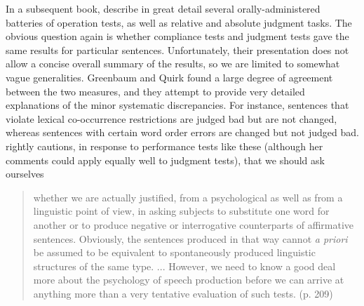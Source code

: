 In a subsequent book, \citet{GreenbaumEtAl1970} describe in great detail several orally-administered batteries of operation tests, as well as relative and
absolute judgment tasks. The obvious question again is whether compliance tests and judgment tests gave the same results for particular sentences. Unfortunately, their presentation does not allow a concise overall summary of the results, so we are limited to somewhat vague generalities. Greenbaum and Quirk found a large degree of agreement between the two measures, and they attempt to provide very detailed explanations of the minor systematic discrepancies. For instance, sentences that violate lexical co-occurrence restrictions are judged bad but are not changed, whereas sentences with certain word order errors are changed but not judged bad. \citet{Tottie1977} rightly cautions, in response to performance tests like these (although her comments could apply equally well to judgment tests), that we should ask ourselves

\begin{quote}
whether we are actually justified, from a psychological  as well as from a linguistic point of view, in asking subjects to substitute one word for another or to produce negative or interrogative counterparts of affirmative sentences. Obviously, the sentences produced in that way cannot \textit{a priori} be assumed to be equivalent to spontaneously produced linguistic structures of the same type. ... However, we need to know a good deal more about the psychology of speech production before we can arrive at anything more than a very tentative evaluation of such tests. (p. 209)
\end{quote}

